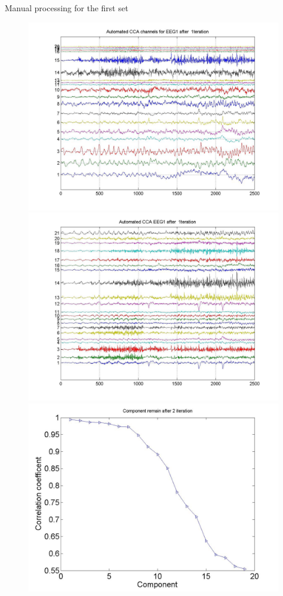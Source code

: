 \documentclass[t,12pt,english
\ifx\beamermode\undefined\else,\beamermode\fi
]{beamer}
\begin{document}
    
\begin{frame}{Manual processing  for the first set}

\begin{figure}[!htbp]
%
\centering
\includegraphics[width=1\textwidth]{9.jpg}\\
\includegraphics[width=1\textwidth]{10.jpg}
\endminipage\hfill
{}%
\centering
\includegraphics[width=1\textwidth]{11.jpg}\\

\end{figure}
\end{frame}
\end{document}
